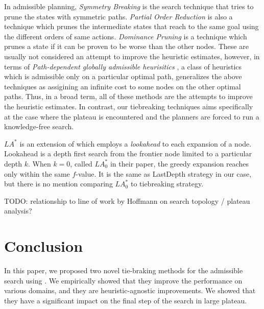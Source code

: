 In admissible planning,
\emph{Symmetry Breaking}
\cite{Fox1998,pochter2011exploiting,domshlak2013symmetry} is the search
technique that tries to prune the states with symmetric
paths. \emph{Partial Order Reduction}
is also a technique which prunes the
intermediate states that reach to the same goal using the different
orders of same actions. \emph{Dominance Pruning} \cite{hall2013faster} is a
technique which prunes a state if it can be proven to be worse than the other nodes.
% 
These are usually not considered an attempt to improve the heuristic
estimates, however, in terms of \emph{Path-dependent globally admissible
heurisitics} \cite{karpas2012optimal}, a class of heuristics which is
admissible only on a particular optimal path, generalizes the above
techniques as assigining an infinite cost to some nodes on the other optimal paths.
% 
Thus, in a broad term, all of these methods are the
attempts to improve the heuristic estimates.
In contrast, our tiebreaking techniques aims specifically at the case
where the plateau is encountered and the planners are forced to run a
knowledge-free search.

$LA^*$ \cite{stern2010look} is an extension of \astar which employs a
\emph{lookahead} to each expansion of a node. Lookahead is a depth first
search from the frontier node limited to a particular depth $k$. When
$k=0$, called $LA^*_0$ in their paper, the greedy expansion reaches only within
the same $f$-value. It is the same as LastDepth strategy in our
case, but there is no mention comparing $LA^*_0$ to tiebreaking strategy.


TODO: relationship to line of work by Hoffmann on search topology / plateau analysis? 
\cite{Hoffmann05,Hoffmann14}


\section{Conclusion}

In this paper, we proposed two novel tie-braking methods for the admissible search using \astar. We empirically showed that they improve the performance on various domains, and they are heuristic-agnostic improvements. We showed that they have a significant impact on the final step of the search in large plateau.

